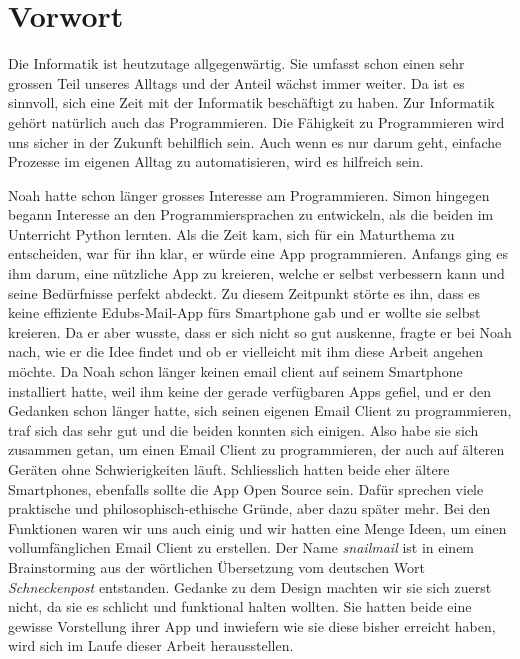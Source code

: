 \documentclass[a4paper,11pt]{article}
\begin{document}
\tableofcontents
\pagebreak

\section{Vorwort}
Die Informatik ist heutzutage allgegenwärtig. Sie umfasst schon einen sehr grossen Teil unseres Alltags und der Anteil wächst immer weiter. Da ist es sinnvoll, sich 
eine Zeit mit der Informatik beschäftigt zu haben. Zur Informatik gehört natürlich auch das Programmieren. Die Fähigkeit zu Programmieren wird uns sicher in der
Zukunft behilflich sein. Auch wenn es nur darum geht, einfache Prozesse im eigenen Alltag zu automatisieren, wird es hilfreich sein. 

Noah hatte schon länger grosses Interesse am Programmieren. Simon hingegen begann Interesse an den Programmiersprachen zu entwickeln, als die beiden im Unterricht 
Python lernten. Als die Zeit kam, sich für ein Maturthema zu entscheiden, war für ihn klar, er würde eine App programmieren. Anfangs ging es ihm darum, eine 
nützliche App zu kreieren, welche er selbst verbessern kann und seine Bedürfnisse perfekt abdeckt.
Zu diesem Zeitpunkt störte es ihn, dass es keine effiziente Edubs-Mail-App fürs Smartphone gab und er wollte sie selbst kreieren. 
Da er aber wusste, dass er sich nicht so gut auskenne, fragte er bei Noah nach, wie er die Idee findet und ob er vielleicht mit ihm diese Arbeit 
angehen möchte.
Da Noah schon länger keinen \gls{email client} auf seinem Smartphone installiert hatte, weil ihm keine der gerade verfügbaren Apps gefiel, und er den Gedanken 
schon länger hatte, sich seinen eigenen Email Client zu programmieren, traf sich das sehr gut und die beiden konnten sich einigen. 
Also habe sie sich zusammen getan, um einen Email Client zu programmieren, der auch auf älteren Geräten ohne Schwierigkeiten läuft. Schliesslich hatten beide
eher ältere Smartphones, ebenfalls sollte die App Open Source sein. 
Dafür sprechen viele praktische und philosophisch-ethische Gründe, aber dazu später mehr.
Bei den Funktionen waren wir uns auch einig und wir hatten eine Menge Ideen, um einen vollumfänglichen Email Client zu erstellen. Der Name \textit{snailmail} ist in einem 
Brainstorming aus der wörtlichen Übersetzung vom deutschen Wort \textit{Schneckenpost} entstanden. Gedanke zu dem Design machten wir sie sich zuerst nicht,
da sie es schlicht und funktional halten wollten. 
Sie hatten beide eine gewisse Vorstellung ihrer App und inwiefern wie sie diese bisher erreicht haben, wird sich im Laufe dieser Arbeit herausstellen. \\
\end{document}
